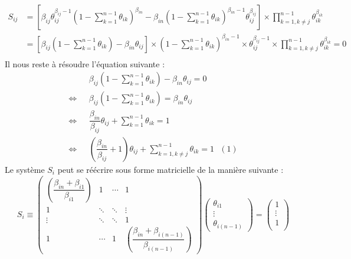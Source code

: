 \documentclass[a4paper,titlepage]{report}
\begin{document}
\[
	\begin{aligned}
		S_{ij} &= \left[\beta_{ij} \theta_{ij}^{\beta_{ij} - 1} \left(1 - \sum\limits_{k = 1}^{n - 1} \theta_{ik}\right)^{\beta_{in}} - \beta_{in} \left(1 - \sum\limits_{k = 1}^{n - 1} \theta_{ik}\right)^{\beta_{in} - 1} \theta_{ij}^{\beta_{ij}}\right] \times \prod\limits_{k = 1, k \neq j}^{n - 1} \theta_{ik}^{\beta_{ik}}\\
		&= \left[\beta_{ij}  \left(1 - \sum\limits_{k = 1}^{n - 1} \theta_{ik}\right) - \beta_{in}  \theta_{ij}\right]\times \left(1 - \sum\limits_{k = 1}^{n - 1} \theta_{ik}\right)^{\beta_{in} - 1} \times \theta_{ij}^{\beta_{ij} - 1} \times \prod\limits_{k = 1, k \neq j}^{n - 1} \theta_{ik}^{\beta_{ik}} = 0\\
	\end{aligned}
\]
Il nous reste à résoudre l'équation suivante :
\[
	\begin{aligned}
		&\beta_{ij} \left(1 - \sum\limits_{k = 1}^{n - 1} \theta_{ik}\right) - \beta_{in} \theta_{ij} = 0\\
		\Leftrightarrow \text{ }&\beta_{ij} \left(1 - \sum\limits_{k = 1}^{n - 1} \theta_{ik}\right) = \beta_{in} \theta_{ij}\\
		\Leftrightarrow \text{ }& \dfrac{\beta_{in}}{\beta_{ij}} \theta_{ij} + \sum\limits_{k = 1}^{n - 1} \theta_{ik} = 1\\
		\Leftrightarrow \text{ }& \left(\dfrac{\beta_{in}}{\beta_{ij}} + 1\right) \theta_{ij} + \sum\limits_{k = 1, k \neq j}^{n - 1} \theta_{ik} = 1 \text{ } (1)	
	\end{aligned}
\]
Le système $S_i$ peut se réécrire sous forme matricielle de la manière suivante : 
\[
S_i \equiv 
\begin{pmatrix}
\left(\dfrac{\beta_{in} + \beta_{i1}}{\beta_{i1}}\right) & 1 & \cdots & 1 \\
1 & \ddots &  \ddots & \vdots \\
\vdots &  \ddots & \ddots & 1\\
1 & \cdots & 1   & \left(\dfrac{\beta_{in} + \beta_{i(n - 1)}}{\beta_{i(n - 1)}}\right)
\end{pmatrix}
\begin{pmatrix}
\theta_{i1}\\
\vdots\\
\theta_{i(n - 1)}
\end{pmatrix}
= 
\begin{pmatrix}
1\\
\vdots\\
1\\
\end{pmatrix}
\]
\end{document}
